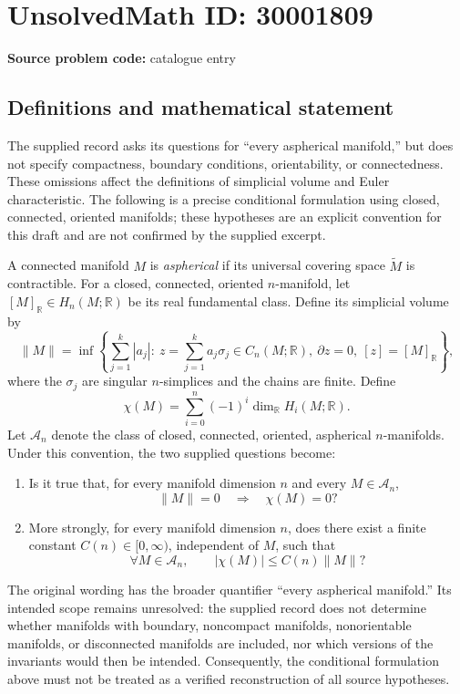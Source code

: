 \documentclass[11pt]{article}
\newcommand{\R}{\mathbb{R}}
\begin{document}
\section*{UnsolvedMath ID: 30001809}
\textbf{Source problem code:} catalogue entry
\subsection{Definitions and mathematical statement}
The supplied record asks its questions for ``every aspherical manifold,'' but does not specify compactness, boundary conditions, orientability, or connectedness. These omissions affect the definitions of simplicial volume and Euler characteristic. The following is a precise conditional formulation using closed, connected, oriented manifolds; these hypotheses are an explicit convention for this draft and are not confirmed by the supplied excerpt.

A connected manifold \(M\) is \emph{aspherical} if its universal covering space \(\widetilde M\) is contractible. For a closed, connected, oriented \(n\)-manifold, let \([M]_{\R}\in H_n(M;\R)\) be its real fundamental class. Define its simplicial volume by
\[
\lVert M\rVert=\inf\left\{\sum_{j=1}^{k}|a_j|:\ z=\sum_{j=1}^{k}a_j\sigma_j\in C_n(M;\R),\ \partial z=0,\ [z]=[M]_{\R}\right\},
\]
where the \(\sigma_j\) are singular \(n\)-simplices and the chains are finite. Define
\[
\chi(M)=\sum_{i=0}^{n}(-1)^i\dim_{\R}H_i(M;\R).
\]
Let \(\mathcal A_n\) denote the class of closed, connected, oriented, aspherical \(n\)-manifolds. Under this convention, the two supplied questions become:
\begin{enumerate}
\item Is it true that, for every manifold dimension \(n\) and every \(M\in\mathcal A_n\),
\[
\lVert M\rVert=0\quad\Longrightarrow\quad\chi(M)=0?
\]
\item More strongly, for every manifold dimension \(n\), does there exist a finite constant \(C(n)\in[0,\infty)\), independent of \(M\), such that
\[
\forall M\in\mathcal A_n,\qquad |\chi(M)|\leq C(n)\lVert M\rVert?
\]
\end{enumerate}
The original wording has the broader quantifier ``every aspherical manifold.'' Its intended scope remains unresolved: the supplied record does not determine whether manifolds with boundary, noncompact manifolds, nonorientable manifolds, or disconnected manifolds are included, nor which versions of the invariants would then be intended. Consequently, the conditional formulation above must not be treated as a verified reconstruction of all source hypotheses.
\end{document}
